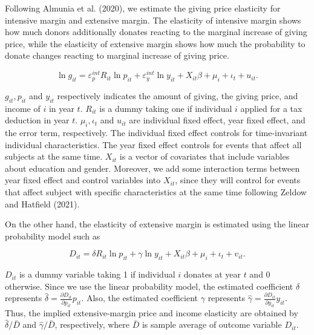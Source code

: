 \documentclass[
  11pt,
  a4paper,
]{article}
\begin{document}
Following Almunia et al. (2020), we estimate the giving price elasticity for intensive margin and extensive margin. The elasticity of intensive margin shows how much donors additionally donates reacting to the marginal increase of giving price, while the elasticity of extensive margin shows how much the probability to donate changes reacting to marginal increase of giving price.

\begin{equation}
    \ln g_{it} = \varepsilon^{int}_p R_{it} \ln p_{it} + \varepsilon^{int}_y \ln y_{it} 
    + X_{it}\beta +\mu_i +\iota_t +u_{it}. \label{eq:intensive}
\end{equation}

\(g_{it}, p_{it}\) and \(y_{it}\) respectively indicates the amount of giving, the giving price, and income of \(i\) in year \(t\).
\(R_{it}\) is a dummy taking one if individual \(i\) applied for a tax deduction in year \(t\).
\(\mu_i, \iota_t\) and \(u_{it}\) are individual fixed effect, year fixed effect, and the error term, respectively.
The individual fixed effect controls for time-invariant individual characteristics. The year fixed effect controls for events that affect all subjects at the same time. \(X_{it}\) is a vector of covariates that include variables about education and gender. Moreover, we add some interaction terms between year fixed effect and control variables into \(X_{it}\), since they will control for events that affect subject with specific characteristics at the same time following Zeldow and Hatfield (2021).

On the other hand,
the elasticity of extensive margin is estimated using the linear probability model such as

\begin{equation}
D_{it} =  \delta R_{it} \ln p_{it} +\gamma \ln y_{it} + X_{it}\beta +\mu_i  +\iota_t +v_{it}. \label{eq:extensive}
\end{equation}

\(D_{it}\) is a dummy variable taking 1 if individual \(i\) donates at year \(t\) and 0 otherwise.
Since we use the linear probability model,
the estimated coefficient \(\delta\) represents \(\hat{\delta} = \frac{\partial D_{it}}{\partial p_{it}} p_{it}\).
Also, the estimated coefficient \(\gamma\) represents \(\hat{\gamma} = \frac{\partial D_{it}}{\partial y_{it}} y_{it}\).
Thus, the implied extensive-margin price and income elasticity are obtained by
\(\hat{\delta}/\bar{D}\) and \(\hat{\gamma}/\bar{D}\), respectively,
where \(\bar{D}\) is sample average of outcome variable \(D_{it}\).
\end{document}
